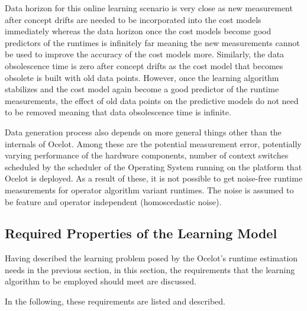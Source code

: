 Data horizon for this online learning scenario is very close as new measurement after concept drifts are needed to be incorporated into the cost models immediately whereas the data horizon once the cost models become good predictors of the runtimes is infinitely far meaning the new measurements cannot be used to improve the accuracy of the cost models more. Similarly, the data obsolescence time is zero after concept drifts as the cost model that becomes obsolete is built with old data points. However, once the learning algorithm stabilizes and the cost model again become a good predictor of the runtime measurements, the effect of old data points on the predictive models do not need to be removed meaning that data obsolescence time is infinite.

Data generation process also depends on more general things other than the internals of Ocelot. Among these are the potential measurement error, potentially varying performance of the hardware components, number of context switches scheduled by the scheduler of the Operating System running on the platform that Ocelot is deployed. As a result of these, it is not possible to get noise-free runtime measurements for operator algorithm variant runtimes. The noise is assumed to be feature and operator independent (homoscedastic noise). 

\subsection{Required Properties of the Learning Model}

Having described the learning problem posed by the Ocelot's runtime estimation needs in the previous section, in this section, the requirements that the learning algorithm to be employed should meet are discussed.

In the following, these requirements are listed and described.

